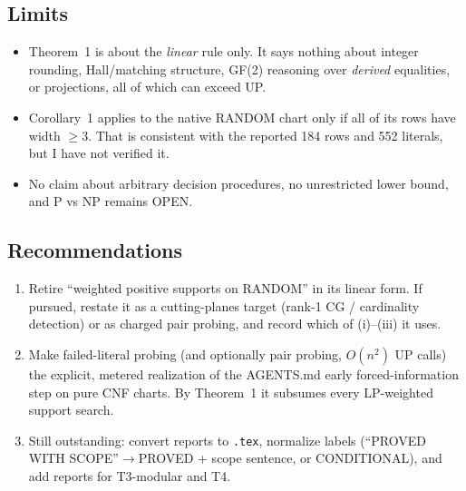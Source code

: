 \documentclass[11pt]{article}
\theoremstyle{definition}
\begin{document}
\subsection{Limits}
\begin{itemize}
\item Theorem~1 is about the \emph{linear} rule only. It says nothing about integer
rounding, Hall/matching structure, GF(2) reasoning over \emph{derived} equalities, or
projections, all of which can exceed UP.
\item Corollary~1 applies to the native RANDOM chart only if all of its rows have
width $\ge3$. That is consistent with the reported 184 rows and 552 literals, but I have
not verified it.
\item No claim about arbitrary decision procedures, no unrestricted lower bound, and
P vs NP remains OPEN.
\end{itemize}

\subsection{Recommendations}
\begin{enumerate}
\item Retire ``weighted positive supports on RANDOM'' in its linear form. If pursued,
restate it as a cutting-planes target (rank-1 CG / cardinality detection) or as charged
pair probing, and record which of (i)--(iii) it uses.
\item Make failed-literal probing (and optionally pair probing, $O(n^2)$ UP calls) the
explicit, metered realization of the AGENTS.md early forced-information step on pure
CNF charts. By Theorem~1 it subsumes every LP-weighted support search.
\item Still outstanding: convert reports to \texttt{.tex}, normalize labels (``PROVED WITH
SCOPE''$\to$PROVED + scope sentence, or CONDITIONAL), and add reports for T3-modular and
T4.
\end{enumerate}
\end{document}
